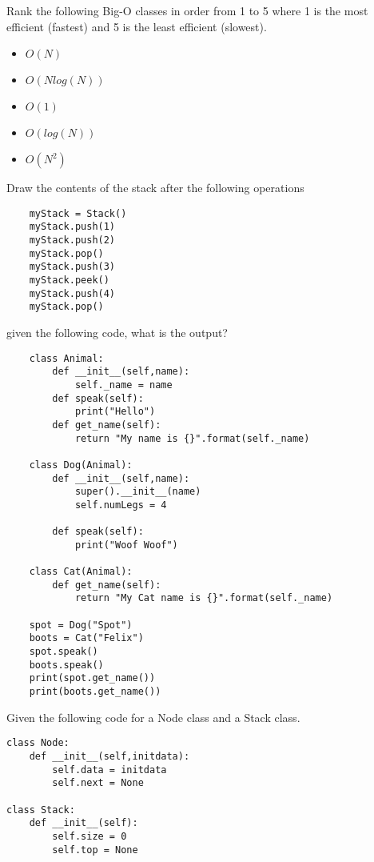 \documentclass[11pt]{exam}
\begin{document}
\begin{questions}


  \question[5] Rank the following Big-O classes in order from 1 to 5 where 1 is the most efficient (fastest) and 5 is the least efficient (slowest).

  \begin{itemize}
  \item $O(N)$
  \item $O(N log(N))$
  \item $O(1)$
  \item $O(log(N))$
  \item $O(N^2)$
  \end{itemize}

  \question[5]  Draw the contents of the stack after the following operations
  \begin{verbatim}
    myStack = Stack()
    myStack.push(1)
    myStack.push(2)
    myStack.pop()
    myStack.push(3)
    myStack.peek()
    myStack.push(4)
    myStack.pop()
  \end{verbatim}
  \vspace{2in}

\newpage
\question[5]  given the following code, what is the output?

\begin{lstlisting}
    class Animal:
        def __init__(self,name):
            self._name = name
        def speak(self):
            print("Hello")
        def get_name(self):
            return "My name is {}".format(self._name)

    class Dog(Animal):
        def __init__(self,name):
            super().__init__(name)
            self.numLegs = 4

        def speak(self):
            print("Woof Woof")

    class Cat(Animal):
        def get_name(self):
            return "My Cat name is {}".format(self._name)

    spot = Dog("Spot")
    boots = Cat("Felix")
    spot.speak()
    boots.speak()
    print(spot.get_name())
    print(boots.get_name())
\end{lstlisting}


\newpage
\question Given the following code for a Node class and a Stack class.

\begin{lstlisting}
class Node:
    def __init__(self,initdata):
        self.data = initdata
        self.next = None

class Stack:
    def __init__(self):
        self.size = 0
        self.top = None


\end{lstlisting}
\end{questions}
\end{document}
